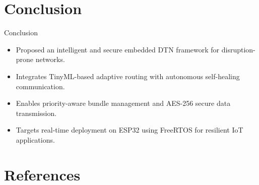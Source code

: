 \documentclass[11pt,aspectratio=43]{beamer}
\begin{document}
\section{Conclusion}

\begin{frame}{Conclusion}

\begin{itemize}
    \item Proposed an intelligent and secure embedded DTN framework for disruption-prone networks.
    \item Integrates TinyML-based adaptive routing with autonomous self-healing communication.
    \item Enables priority-aware bundle management and AES-256 secure data transmission.
    \item Targets real-time deployment on ESP32 using FreeRTOS for resilient IoT applications.
\end{itemize}

\end{frame}
\section{References}
\end{document}
